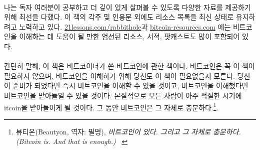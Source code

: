 \paragraph{}
나는 독자 여러분이 공부하고 더 깊이 있게 살펴볼 수 있도록 다양한 자료를 제공하기 위해 최선을 다했다.
이 책의 각주 및 인용문 외에도 리소스 목록을 최신 상태로 유지하려고 노력하고 있다. 
\href{https://21lessons.com/rabbithole}{21lessons.com/rabbithole}과 \href{https://bitcoin-resources.com}{bitcoin-resources.com}
에는 비트코인을 이해하는 데 도움이 될 만한 엄선된 리소스, 서적, 팟캐스트도 많이 포함되어 있다.

\paragraph{}
간단히 말해, 이 책은 비트코이너가 쓴 비트코인에 관한 책이다. 
비트코인은 꼭 이 책이 필요하지 않으며, 비트코인을 이해하기 위해 당신도 이 책이 필요없을지 모른다. 
당신이 준비가 되었다면 즉시 비트코인을 이해할 수 있을 것이고, 
비트코인을 이해했다면 비트코인을 받아들일 수 있을 것이다. 
본질적으로 모든 사람이 아주 적절한 시기에 \bitcoinB{}itcoin을 받아들이게 될 것이다. 
그 동안 비트코인은 그 자체로 충분하다.\footnote{뷰티온(Beautyon, 역자: 필명), \textit{비트코인이 있다. 그리고 그 자체로 충분하다. (Bitcoin is. And that is enough.)} ~\cite{bitcoin-is}}.